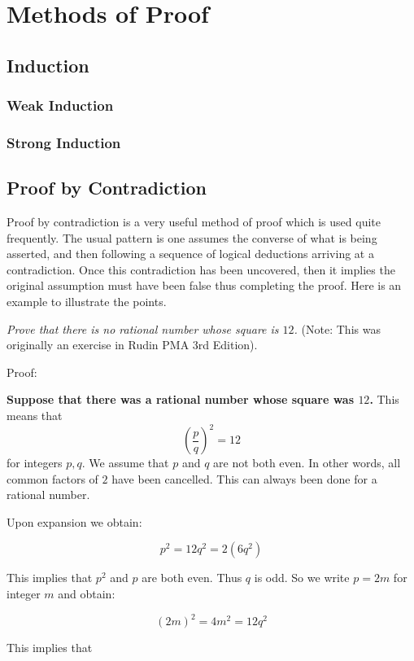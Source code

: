\chapter{Methods of Proof}

\section{Induction}

\subsection{Weak Induction}

\subsection{Strong Induction}

\section{Proof by Contradiction}

Proof by contradiction is a very useful method of proof which is used quite frequently.  The usual pattern is one assumes the converse of what is being asserted, and then following a sequence of logical deductions arriving at a contradiction.  Once this contradiction has been uncovered, then it implies the original assumption must have been false thus completing the proof.  Here is an example to illustrate the points.


\textit{Prove that there is no rational number whose square is $12$.}  (Note:  This was originally an exercise in Rudin PMA 3rd Edition).

Proof:

\textbf{Suppose that there was a rational number whose square was $12$.}  This means that
$$ \left(\frac{p}{q}\right)^{2}=12$$ for integers $p,q.$  We assume that $p$ and $q$ are not both even.  In other words, all common factors of $2$ have been cancelled.  This can always been done for a rational number.

Upon expansion we obtain:

$$p^{2}=12q^{2}=2\left(6q^{2}\right)$$

This implies that $p^{2}$ and $p$ are both even.  Thus $q$ is odd.  So we write $p=2m$ for integer $m$ and obtain:

$$\left(2m\right)^{2}=4m^{2}=12q^{2}$$

This implies that 

